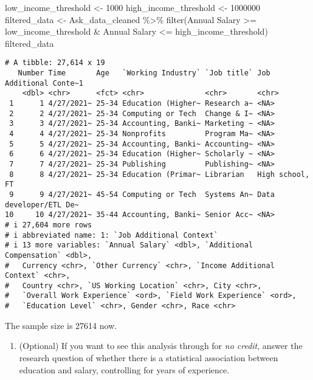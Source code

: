 \documentclass[
  letterpaper,
  DIV=11,
  numbers=noendperiod]{scrartcl}
\newenvironment{Shaded}{\begin{snugshade}}{\end{snugshade}}
\newcommand{\AttributeTok}[1]{\textcolor[rgb]{0.40,0.45,0.13}{#1}}
\newcommand{\DecValTok}[1]{\textcolor[rgb]{0.68,0.00,0.00}{#1}}
\newcommand{\FunctionTok}[1]{\textcolor[rgb]{0.28,0.35,0.67}{#1}}
\newcommand{\NormalTok}[1]{\textcolor[rgb]{0.00,0.23,0.31}{#1}}
\newcommand{\OtherTok}[1]{\textcolor[rgb]{0.00,0.23,0.31}{#1}}
\newcommand{\SpecialCharTok}[1]{\textcolor[rgb]{0.37,0.37,0.37}{#1}}
\newcommand{\StringTok}[1]{\textcolor[rgb]{0.13,0.47,0.30}{#1}}
\providecommand{\tightlist}{%
  \setlength{\itemsep}{0pt}\setlength{\parskip}{0pt}}\usepackage{longtable,booktabs,array}
\begin{document}
\begin{Shaded}
\begin{Highlighting}[]
\NormalTok{low\_income\_threshold }\OtherTok{\textless{}{-}} \DecValTok{1000}
\NormalTok{high\_income\_threshold }\OtherTok{\textless{}{-}} \DecValTok{1000000}
\NormalTok{filtered\_data }\OtherTok{\textless{}{-}}\NormalTok{ Ask\_data\_cleaned }\SpecialCharTok{\%\textgreater{}\%}
  \FunctionTok{filter}\NormalTok{(}\StringTok{\textasciigrave{}}\AttributeTok{Annual Salary}\StringTok{\textasciigrave{}} \SpecialCharTok{\textgreater{}=}\NormalTok{ low\_income\_threshold }\SpecialCharTok{\&} \StringTok{\textasciigrave{}}\AttributeTok{Annual Salary}\StringTok{\textasciigrave{}} \SpecialCharTok{\textless{}=}\NormalTok{ high\_income\_threshold)}
\NormalTok{filtered\_data}
\end{Highlighting}
\end{Shaded}

\begin{verbatim}
# A tibble: 27,614 x 19
   Number Time       Age   `Working Industry` `Job title` Job Additional Conte~1
    <dbl> <chr>      <fct> <chr>              <chr>       <chr>                 
 1      1 4/27/2021~ 25-34 Education (Higher~ Research a~ <NA>                  
 2      2 4/27/2021~ 25-34 Computing or Tech  Change & I~ <NA>                  
 3      3 4/27/2021~ 25-34 Accounting, Banki~ Marketing ~ <NA>                  
 4      4 4/27/2021~ 25-34 Nonprofits         Program Ma~ <NA>                  
 5      5 4/27/2021~ 25-34 Accounting, Banki~ Accounting~ <NA>                  
 6      6 4/27/2021~ 25-34 Education (Higher~ Scholarly ~ <NA>                  
 7      7 4/27/2021~ 25-34 Publishing         Publishing~ <NA>                  
 8      8 4/27/2021~ 25-34 Education (Primar~ Librarian   High school, FT       
 9      9 4/27/2021~ 45-54 Computing or Tech  Systems An~ Data developer/ETL De~
10     10 4/27/2021~ 35-44 Accounting, Banki~ Senior Acc~ <NA>                  
# i 27,604 more rows
# i abbreviated name: 1: `Job Additional Context`
# i 13 more variables: `Annual Salary` <dbl>, `Additional Compensation` <dbl>,
#   Currency <chr>, `Other Currency` <chr>, `Income Additional Context` <chr>,
#   Country <chr>, `US Working Location` <chr>, City <chr>,
#   `Overall Work Experience` <ord>, `Field Work Experience` <ord>,
#   `Education Level` <chr>, Gender <chr>, Race <chr>
\end{verbatim}

The sample size is 27614 now.

\begin{enumerate}
\def\labelenumi{\alph{enumi}.}
\setcounter{enumi}{5}
\tightlist
\item
  (Optional) If you want to see this analysis through for \emph{no
  credit}, answer the research question of whether there is a
  statistical association between education and salary, controlling for
  years of experience.
\end{enumerate}
\end{document}
